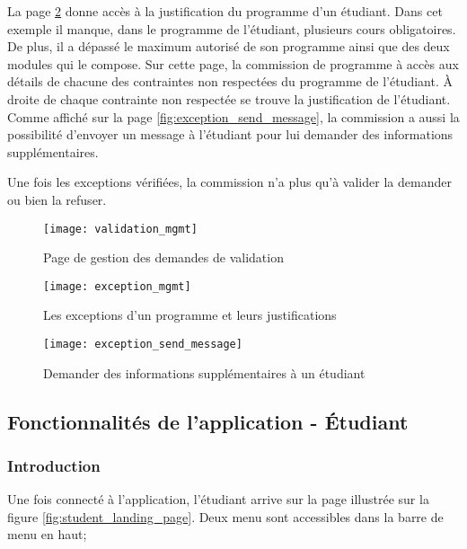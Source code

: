 La page \ref{fig:exception_mgmt} donne accès à la justification du programme d'un étudiant. Dans cet exemple il manque, dans le programme de l'étudiant, plusieurs cours obligatoires. De plus, il a dépassé le maximum autorisé de son programme ainsi que des deux modules qui le compose. Sur cette page, la commission de programme à accès aux détails de chacune des contraintes non respectées du programme de l'étudiant. À droite de chaque contrainte non respectée se trouve la justification de l'étudiant. Comme affiché sur la page \ref{fig:exception_send_message}, la commission a aussi la possibilité d'envoyer un message à l'étudiant pour lui demander des informations supplémentaires. 

Une fois les exceptions vérifiées, la commission n'a plus qu'à valider la demander ou bien la refuser. 




\begin{figure}
\centering
\caption{Page de gestion des demandes de validation}
\label{fig:validation_mgmt}
\texttt{[image: validation\_mgmt]}
\end{figure}

\begin{figure}[!htb]
\centering
\caption{Les exceptions d'un programme et leurs justifications}
\label{fig:exception_mgmt}
\texttt{[image: exception\_mgmt]}
\end{figure}

\begin{figure}
\centering
\caption{Demander des informations supplémentaires à un étudiant}
\label{fig:exception__send_message}
\texttt{[image: exception\_send\_message]}
\end{figure}

\clearpage
\subsection{Fonctionnalités de l'application - Étudiant}
\subsubsection{Introduction}
Une fois connecté à l'application, l'étudiant arrive sur la page illustrée sur la figure \ref{fig:student_landing_page}. Deux menu sont accessibles dans la barre de menu en haut; 

